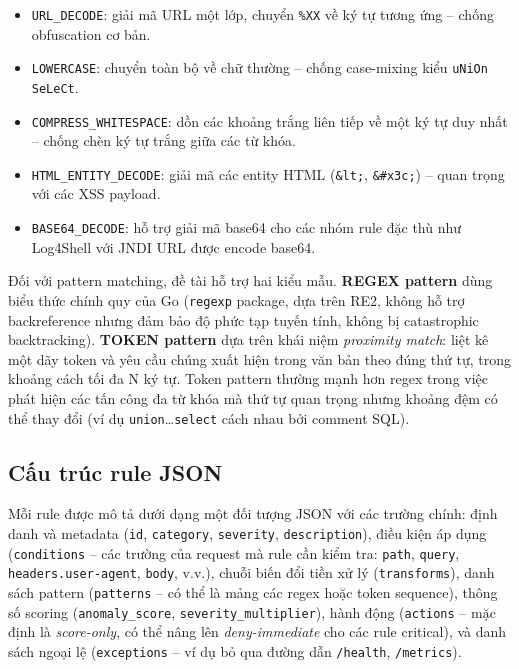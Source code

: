 \documentclass[../DoAn.tex]{subfiles}
\begin{document}
\begin{itemize}[leftmargin=*]
    \item \texttt{URL\_DECODE}: giải mã URL một lớp, chuyển \texttt{\%XX}
    về ký tự tương ứng -- chống obfuscation cơ bản.
    \item \texttt{LOWERCASE}: chuyển toàn bộ về chữ thường -- chống
    case-mixing kiểu \texttt{uNiOn SeLeCt}.
    \item \texttt{COMPRESS\_WHITESPACE}: dồn các khoảng trắng liên tiếp về
    một ký tự duy nhất -- chống chèn ký tự trắng giữa các từ khóa.
    \item \texttt{HTML\_ENTITY\_DECODE}: giải mã các entity HTML
    (\texttt{\&lt;}, \texttt{\&\#x3c;}) -- quan trọng với các XSS payload.
    \item \texttt{BASE64\_DECODE}: hỗ trợ giải mã base64 cho các nhóm rule
    đặc thù như Log4Shell với JNDI URL được encode base64.
\end{itemize}

Đối với pattern matching, đề tài hỗ trợ hai kiểu mẫu. \textbf{REGEX pattern}
dùng biểu thức chính quy của Go (\texttt{regexp} package, dựa trên RE2,
không hỗ trợ backreference nhưng đảm bảo độ phức tạp tuyến tính, không bị
catastrophic backtracking). \textbf{TOKEN pattern} dựa trên khái niệm
\textit{proximity match}: liệt kê một dãy token và yêu cầu chúng xuất hiện
trong văn bản theo đúng thứ tự, trong khoảng cách tối đa N ký tự. Token
pattern thường mạnh hơn regex trong việc phát hiện các tấn công đa từ khóa
mà thứ tự quan trọng nhưng khoảng đệm có thể thay đổi (ví dụ
\texttt{union}\ldots\texttt{select} cách nhau bởi comment SQL).

\subsection{Cấu trúc rule JSON}
\label{subsection:3.2.2}

Mỗi rule được mô tả dưới dạng một đối tượng JSON với các trường chính: định
danh và metadata (\texttt{id}, \texttt{category}, \texttt{severity},
\texttt{description}), điều kiện áp dụng (\texttt{conditions} -- các trường
của request mà rule cần kiểm tra: \texttt{path}, \texttt{query},
\texttt{headers.user-agent}, \texttt{body}, v.v.), chuỗi biến đổi tiền xử lý
(\texttt{transforms}), danh sách pattern (\texttt{patterns} -- có thể là
mảng các regex hoặc token sequence), thông số scoring (\texttt{anomaly\_score},
\texttt{severity\_multiplier}), hành động (\texttt{actions} -- mặc định là
\textit{score-only}, có thể nâng lên \textit{deny-immediate} cho các rule
critical), và danh sách ngoại lệ (\texttt{exceptions} -- ví dụ bỏ qua đường
dẫn \texttt{/health}, \texttt{/metrics}).
\end{document}
